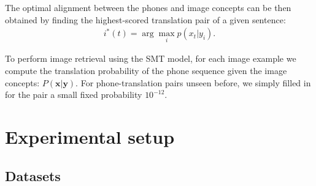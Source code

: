 \documentclass[a4paper]{article}
\begin{document}
The optimal alignment between the phones and image concepts can be then obtained by finding the highest-scored translation pair of a given sentence:
\begin{align}\label{eq:smt_alignment}
    i^*(t) = \arg\max_i p(x_t|y_i).
\end{align}


To perform image retrieval using the SMT model, for each image example we compute the translation probability of the phone sequence given the image concepts: $P(\mathbf x|\mathbf y)$.
For phone-translation pairs unseen before, we simply filled in for the pair a small fixed probability $10^{-12}$.

\section{Experimental setup}
\subsection{Datasets}
\end{document}
